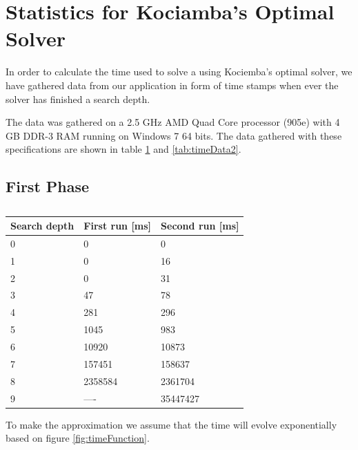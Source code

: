 \section{Statistics for Kociamba's Optimal Solver}
\label{app:kociembaTime}
In order to calculate the time used to solve a \rubik{} using Kociemba's optimal solver, we have gathered data from our application in form of time stamps when ever the solver has finished a search depth.

The data was gathered on a 2.5 GHz AMD Quad Core processor (905e) with 4 GB DDR-3 RAM running on Windows 7 64 bits.
The data gathered with these specifications are shown in table \ref{tab:timeData} and \ref{tab:timeData2}.

\subsection{First Phase}

\begin{table}[hb]
\centering
	\begin{tabular}{|l|l|l|}
	\hline
	Search depth&First run [ms]&Second run [ms]\\
	\hline
	0&0&0\\
	\hline
	1&0&16\\
	\hline
	2&0&31\\
	\hline
	3&47&78\\
	\hline
	4&281&296\\
	\hline
	5&1045&983\\
	\hline
	6&10920&10873\\
	\hline
	7&157451&158637\\
	\hline
	8&2358584&2361704\\
	\hline
	9&----&35447427\\
	\hline
	\end{tabular}
\caption{}
	\label{tab:timeData}
\end{table}

To make the approximation we assume that the time will evolve exponentially based on figure \ref{fig:timeFunction}.

